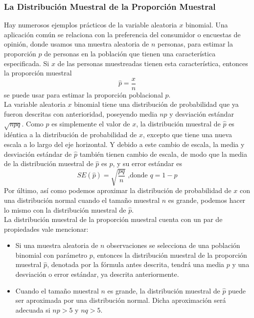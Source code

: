\documentclass[]{article}
\begin{document}
\subsubsection*{La Distribución Muestral de la Proporción Muestral}
Hay numerosos ejemplos prácticos de la variable aleatoria $x$ binomial. Una aplicación común se relaciona con la preferencia del consumidor o encuestas de opinión, donde usamos una muestra aleatoria de $n$ personas, para estimar la proporción $p$ de personas en la población que tienen una característica especificada. Si $x$ de las personas muestreadas tienen esta característica, entonces la proporción muestral
\[
\hat{p} = \frac{x}{n}
\]
se puede usar para estimar la proporción poblacional $p$.
\\ La variable aleatoria $x$ binomial tiene una distribución de probabilidad que ya fueron descritas con anterioridad, poseyendo media $np$ y desviación estándar $\sqrt{npq}$. Como $\hat{p}$ es simplemente el valor de $x$, la distribución muestral de $\hat{p}$ es idéntica a la distribución de probabilidad de $x$, excepto que tiene una nueva escala a lo largo del eje horizontal. Y debido a este cambio de escala, la media y desviación estándar de $\hat{p}$ también tienen cambio de escala, de modo que la media de la distribución muestral de $\hat{p}$ es $p$, y su error estándar es
\[
SE(\hat{p}) = \sqrt{\frac{pq}{n}} \text{ ,donde } q = 1 - p
\]
Por último, así como podemos aproximar la distribución de probabilidad de $x$ con una distribución normal cuando el tamaño muestral $n$ es grande, podemos hacer lo mismo con la distribución muestral de $\hat{p}$.
\\ La distribución muestral de la proporción muestral cuenta con un par de propiedades vale mencionar:
\begin{itemize}
	\item Si una muestra aleatoria de $n$ observaciones se selecciona de una población binomial con parámetro $p$, entonces la distribución muestral de la proporción muestral $\hat{p}$, denotada por la fórmula antes descrita, tendrá una media $p$ y una desviación o error estándar, ya descrita anteriormente.
	\item Cuando el tamaño muestral $n$ es grande, la distribución muestral de $\hat{p}$ puede ser  aproximada por una distribución normal. Dicha aproximación será adecuada si $np > 5$ y $nq > 5$.
\end{itemize}
\end{document}
